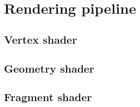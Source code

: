 \section{Rendering pipeline}
\label{sec:opengl_rendering_pipeline}
\subsection{Vertex shader}
\subsection{Geometry shader}
\subsection{Fragment shader}